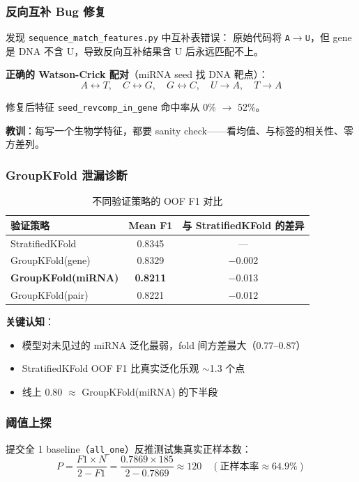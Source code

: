 \documentclass[11pt,a4paper]{article}
\begin{document}
\subsubsection{反向互补 Bug 修复}

发现 \texttt{sequence\_match\_features.py} 中互补表错误：
原始代码将 \texttt{A$\to$U}，但 gene 是 DNA 不含 U，导致反向互补结果含 U 后永远匹配不上。

\textbf{正确的 Watson-Crick 配对}（miRNA seed 找 DNA 靶点）：
\[
A \leftrightarrow T, \quad C \leftrightarrow G, \quad G \leftrightarrow C, \quad U \to A, \quad T \to A
\]

修复后特征 \texttt{seed\_revcomp\_in\_gene} 命中率从 0\% $\to$ 52\%。

\textbf{教训}：每写一个生物学特征，都要 sanity check——看均值、与标签的相关性、零方差列。

\subsubsection{GroupKFold 泄漏诊断}

\begin{table}[H]
\centering
\caption{不同验证策略的 OOF F1 对比}
\begin{tabular}{lcc}
\toprule
验证策略 & Mean F1 & 与 StratifiedKFold 的差异 \\
\midrule
StratifiedKFold & 0.8345 & --- \\
GroupKFold(gene) & 0.8329 & $-$0.002 \\
\textbf{GroupKFold(miRNA)} & \textbf{0.8211} & $-$0.013 \\
GroupKFold(pair) & 0.8221 & $-$0.012 \\
\bottomrule
\end{tabular}
\end{table}

\textbf{关键认知}：
\begin{itemize}[nosep]
    \item 模型对未见过的 miRNA 泛化最弱，fold 间方差最大（0.77--0.87）
    \item StratifiedKFold OOF F1 比真实泛化乐观 $\sim$1.3 个点
    \item 线上 0.80 $\approx$ GroupKFold(miRNA) 的下半段
\end{itemize}

\subsubsection{阈值上探}

提交全 1 baseline（\texttt{all\_one}）反推测试集真实正样本数：
\[
P = \frac{F1 \times N}{2 - F1} = \frac{0.7869 \times 185}{2 - 0.7869} \approx 120 \quad (\text{正样本率} \approx 64.9\%)
\]
\end{document}
